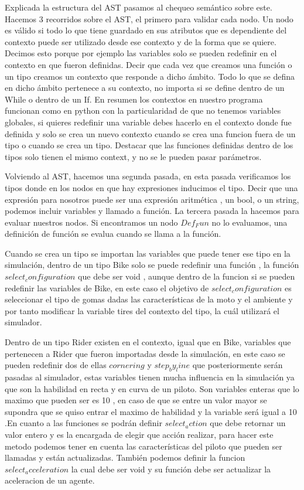 	Explicada la estructura del AST pasamos al chequeo semántico sobre este. Hacemos 3 recorridos sobre el AST, el primero para validar cada nodo. Un nodo es válido si todo lo que tiene guardado en sus atributos que es dependiente del contexto puede ser utilizado desde ese contexto y de la forma que se quiere. Decimos esto porque por ejemplo las variables solo se pueden redefinir en el contexto en que fueron definidas. Decir que cada vez que creamos una función o un tipo creamos un contexto que responde a dicho ámbito. Todo lo que se defina en dicho ámbito pertenece a su contexto, no importa si se define dentro de un While o dentro de un If. En resumen los contextos en nuestro programa funcionan como en python con la particularidad de que no tenemos variables globales, si quieres redefinir una variable debes hacerlo en el contexto donde fue definida y solo se crea un nuevo contexto cuando se crea una funcion fuera de un tipo o cuando se crea un tipo. Destacar que las funciones definidas dentro de los tipos solo tienen el mismo context, y no se le pueden pasar parámetros.
	
	Volviendo al AST, hacemos una segunda pasada, en esta pasada verificamos los tipos donde en los nodos en que hay expresiones inducimos el tipo. Decir que	una expresión para nosotros puede ser una expresión aritmética , un bool, o un string, podemos incluir variables y llamado a función. La tercera pasada la hacemos para evaluar nuestros nodos. Si encontramos un nodo $Def_Fun$ no lo evaluamos, una definición de función se evalua cuando se llama a la función.
	
	Cuando se crea un tipo se importan las variables que puede tener ese tipo en la simulación, dentro de un tipo Bike solo se puede redefinir una función , la función $select_configuration$ que debe ser void , aunque dentro de la funcion si se pueden redefinir las variables de Bike, en este caso el objetivo de $select_configuration$ es seleccionar el tipo de gomas dadas las características de la moto y el ambiente y por tanto modificar la variable tires del contexto del tipo, la cuál utilizará el simulador. 
	
	Dentro de un tipo Rider existen en el contexto, igual que en Bike, variables que pertenecen a Rider que fueron importadas desde la simulación, en este caso se pueden redefinir dos de ellas $cornering$ y $step_by_line$ que posteriormente serán pasadas al simulador, estas variables tienen mucha influencia en la simulación ya que son la habilidad en recta y en curva de un piloto. Son variables enteras que lo maximo que pueden ser es 10 , en caso de que se entre un valor mayor se supondra que se quiso entrar el maximo de habilidad y la variable será igual a 10 .En cuanto a las funciones se podrán definir $select_action$ que debe retornar un valor entero y es la encargada
	de elegir que acción realizar, para hacer este metodo podemos tener en cuenta las características del piloto que pueden ser llamadas y están actualizadas. También podemos definir la funcion $select_acceleration$ la cual debe ser void y su función debe ser actualizar la aceleracion de un agente.
	
